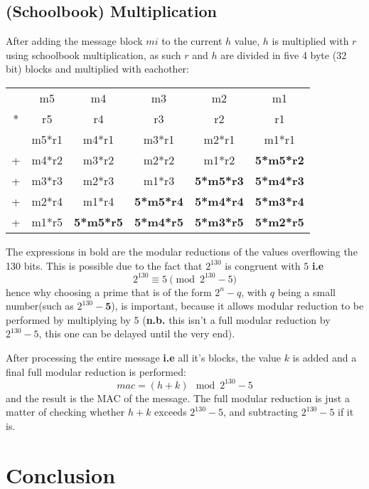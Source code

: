 \documentclass[twocolumn]{article}
\begin{document}
\subsection{(Schoolbook) Multiplication}
After adding the message block $mi$ to the current $h$ value, $h$ is multiplied with $r$ using schoolbook multiplication, as such $r$ and $h$ are divided in five 4 byte
(32 bit) blocks and multiplied with eachother:
\begin{tabular}{cccccc}
    & m5 & m4 & m3 & m2 & m1 \\
*   & r5 & r4 & r3 & r2 & r1 \\
\hline
    & m5*r1 & m4*r1 & m3*r1 & m2*r1 & m1*r1 \\
+   & m4*r2 & m3*r2 & m2*r2 & m1*r2 & \textbf{5*m5*r2} \\
+   & m3*r3 & m2*r3 & m1*r3 & \textbf{5*m5*r3} & \textbf{5*m4*r3} \\
+   & m2*r4 & m1*r4 & \textbf{5*m5*r4} & \textbf{5*m4*r4} & \textbf{5*m3*r4} \\
+   & m1*r5 & \textbf{5*m5*r5} & \textbf{5*m4*r5} & \textbf{5*m3*r5} & \textbf{5*m2*r5}\\
\end{tabular}
The expressions in bold are the modular reductions of the values overflowing the 130 bits. This is possible due to the fact that $2^{130}$ is congruent with $5$ 
\textbf{i.e} $$2^{130} \equiv 5 \pmod{2^{130}-5}$$ hence why choosing a prime that is of the form $2^n-q$, with $q$ being a small number(such as $2^{130}-\textbf{5}$), 
is important, because it allows modular reduction to be performed by multiplying by 5 (\textbf{n.b.} this isn't a full modular reduction by $2^{130}-5$, this one can be 
delayed until the very end).

After processing the entire message \textbf{i.e} all it's blocks, the value $k$ is added and a final full modular reduction is performed:
$$mac = (h+k) \mod{2^{130}-5} $$
and the result is the MAC of the message.
\newline
The full modular reduction is just a matter of checking whether $h+k$ exceeds $2^{130}-5$, and subtracting $2^{130}-5$ if it is.

\section{Conclusion}

\printbibliography
\end{document}
